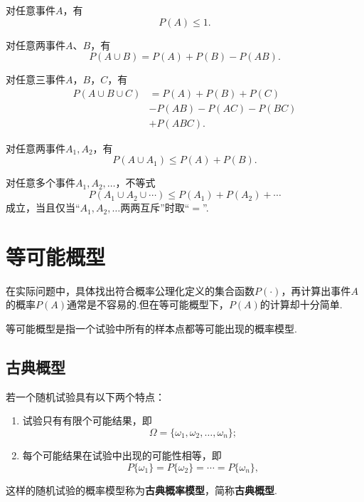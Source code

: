 \begin{property}
对任意事件\(A\)，有\begin{equation}
P(A) \leqslant 1.
\end{equation}
\end{property}

\begin{theorem}[概率的加法]
对任意两事件\(A\)、\(B\)，有\begin{equation}
P(A \cup B) = P(A) + P(B) - P(AB).
\end{equation}
\end{theorem}

\begin{corollary}
对任意三事件\(A\)，\(B\)，\(C\)，有\begin{equation}
\begin{aligned}
P(A \cup B \cup C)
&= P(A) + P(B) + P(C) \\
&- P(AB) - P(AC) - P(BC) \\
&+ P(ABC).
\end{aligned}
\end{equation}
\end{corollary}

\begin{theorem}
对任意两事件\(A_1,A_2\)，有\begin{equation}
P(A \cup A_1) \leqslant P(A) + P(B).
\end{equation}
\end{theorem}

\begin{corollary}[布尔不等式]
对任意多个事件\(A_1,A_2,\dotsc\)，不等式\begin{equation}\label{equation:概率论基础.布尔不等式}
P(A_1 \cup A_2 \cup \dotsb)
\leqslant
P(A_1) + P(A_2) + \dotsb
\end{equation}
成立，当且仅当“\(A_1,A_2,\dotsc\)两两互斥”时取“\(=\)”.
\end{corollary}

\section{等可能概型}
在实际问题中，具体找出符合概率公理化定义的集合函数\(P(\cdot)\)，再计算出事件\(A\)的概率\(P(A)\)通常是不容易的.但在等可能概型下，\(P(A)\)的计算却十分简单.

等可能概型是指一个试验中所有的样本点都等可能出现的概率模型.
\subsection{古典概型}
\begin{definition}
若一个随机试验具有以下两个特点：
\begin{enumerate}
\item 试验只有有限个可能结果，即\[
\Omega = \{\omega_1, \omega_2, \dotsc, \omega_n\};
\]

\item 每个可能结果在试验中出现的可能性相等，即\[
P\{\omega_1\} = P\{\omega_2\} = \dotsb = P\{\omega_n\},
\]
\end{enumerate}
这样的随机试验的概率模型称为\textbf{古典概率模型}，简称\textbf{古典概型}.
\end{definition}

